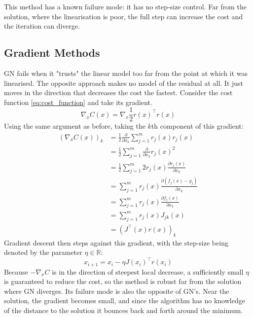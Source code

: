 This method has a known failure mode: it has no step-size control. Far from the solution, where the linearisation is poor, the full step can increase the cost and the iteration can diverge.
\subsection{Gradient Methods}
GN fails when it "trusts" the linear model too far from the point at which it was linearised. The opposite approach makes no model of the residual at all. It just moves in the direction that decreases the cost the fastest. Consider the cost function \eqref{eq:cost_function} and take its gradient.
\begin{equation}
  \nabla_x C(x) = \nabla_x \frac{1}{2} r(x)^\top r(x)
\end{equation}
Using the same argument as before, taking the $k$th component of this gradient:
\begin{align}
  \left(\nabla_x C(x)\right)_k &= \frac{1}{2} \frac{\partial}{\partial x_k} \sum_{j = 1}^{m} r_j(x) r_j(x) \\
                &= \frac{1}{2} \sum_{j = 1}^{m} \frac{\partial}{\partial x_k} r_j(x)^2 \\
                &= \frac{1}{2} \sum_{j = 1}^m 2r_j(x) \frac{\partial r_j(x)}{\partial x_k} \\
                &= \sum_{j = 1}^m r_j(x) \frac{\partial (f_j(x) - y_j)}{\partial x_k} \\
                &= \sum_{j = 1}^m r_j(x) \frac{\partial f_j(x)}{\partial x_k} \\
                &= \sum_{j=1}^m r_j(x) J_{jk}(x) \\
                &= \left(J^\top(x) r(x)\right)_k
\end{align}
Gradient descent then steps against this gradient, with the step-size being denoted by the parameter $\eta \in \mathbb{R}$:
\begin{equation}
  x_{i + 1} = x_i - \eta J(x_i)^\top r(x_i) 
\end{equation}
Because $-\nabla_x C$ is in the direction of steepest local decrease, a sufficiently small $\eta$ is guaranteed to reduce the cost, so the method is robust far from the solution where GN diverges. Its failure mode is also the opposite of GN's. Near the solution, the gradient becomes small, and since the algorithm has no knowledge of the distance to the solution it bounces back and forth around the minimum.


